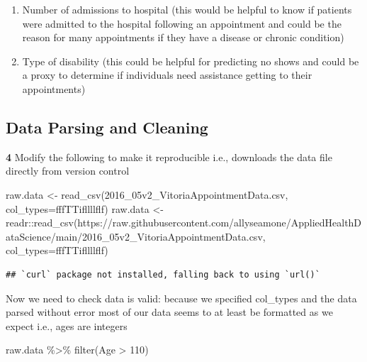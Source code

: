 \documentclass[
]{article}
\newenvironment{Shaded}{\begin{snugshade}}{\end{snugshade}}
\newcommand{\AttributeTok}[1]{\textcolor[rgb]{0.77,0.63,0.00}{#1}}
\newcommand{\DecValTok}[1]{\textcolor[rgb]{0.00,0.00,0.81}{#1}}
\newcommand{\FunctionTok}[1]{\textcolor[rgb]{0.00,0.00,0.00}{#1}}
\newcommand{\NormalTok}[1]{#1}
\newcommand{\OtherTok}[1]{\textcolor[rgb]{0.56,0.35,0.01}{#1}}
\newcommand{\SpecialCharTok}[1]{\textcolor[rgb]{0.00,0.00,0.00}{#1}}
\newcommand{\StringTok}[1]{\textcolor[rgb]{0.31,0.60,0.02}{#1}}
\begin{document}
\begin{enumerate}
\def\labelenumi{\arabic{enumi}.}
\setcounter{enumi}{1}
\item
  Number of admissions to hospital (this would be helpful to know if
  patients were admitted to the hospital following an appointment and
  could be the reason for many appointments if they have a disease or
  chronic condition)
\item
  Type of disability (this could be helpful for predicting no shows and
  could be a proxy to determine if individuals need assistance getting
  to their appointments)
\end{enumerate}

\hypertarget{data-parsing-and-cleaning}{%
\subsection{Data Parsing and Cleaning}\label{data-parsing-and-cleaning}}

\textbf{4} Modify the following to make it reproducible i.e., downloads
the data file directly from version control

\begin{Shaded}
\begin{Highlighting}[]
\NormalTok{raw.data }\OtherTok{\textless{}{-}} \FunctionTok{read\_csv}\NormalTok{(}\StringTok{\textquotesingle{}2016\_05v2\_VitoriaAppointmentData.csv\textquotesingle{}}\NormalTok{, }\AttributeTok{col\_types=}\StringTok{\textquotesingle{}fffTTifllllflf\textquotesingle{}}\NormalTok{)}
\NormalTok{raw.data }\OtherTok{\textless{}{-}}\NormalTok{ readr}\SpecialCharTok{::}\FunctionTok{read\_csv}\NormalTok{(}\StringTok{\textquotesingle{}https://raw.githubusercontent.com/allyseamone/AppliedHealthDataScience/main/2016\_05v2\_VitoriaAppointmentData.csv\textquotesingle{}}\NormalTok{, }\AttributeTok{col\_types=}\StringTok{\textquotesingle{}fffTTifllllflf\textquotesingle{}}\NormalTok{)}
\end{Highlighting}
\end{Shaded}

\begin{verbatim}
## `curl` package not installed, falling back to using `url()`
\end{verbatim}

Now we need to check data is valid: because we specified col\_types and
the data parsed without error most of our data seems to at least be
formatted as we expect i.e., ages are integers

\begin{Shaded}
\begin{Highlighting}[]
\NormalTok{raw.data }\SpecialCharTok{\%\textgreater{}\%} \FunctionTok{filter}\NormalTok{(Age }\SpecialCharTok{\textgreater{}} \DecValTok{110}\NormalTok{)}
\end{Highlighting}
\end{Shaded}
\end{document}
